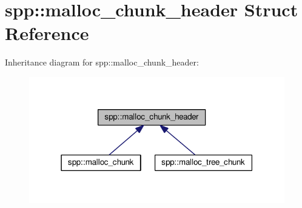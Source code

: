\hypertarget{structspp_1_1malloc__chunk__header}{}\section{spp\+:\+:malloc\+\_\+chunk\+\_\+header Struct Reference}
\label{structspp_1_1malloc__chunk__header}


Inheritance diagram for spp\+:\+:malloc\+\_\+chunk\+\_\+header\+:\nopagebreak
\begin{figure}[H]
\begin{center}
\leavevmode
\includegraphics[width=316pt]{structspp_1_1malloc__chunk__header__inherit__graph}
\end{center}
\end{figure}
